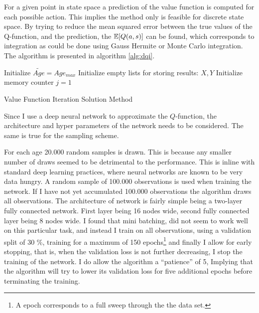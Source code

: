 For a given point in state space a prediction of the value function is computed for each possible action. This implies the method only is feasible for discrete state space. By trying to reduce the mean squared error between the true values of the Q-function, and the prediction, the $\mathbb{E}[Q(a, s)]$ can be found, which corresponds to integration as could be done using Gauss Hermite or Monte Carlo integration. The algorithm is presented in algorithm \ref{alg:dqi}.

\begin{algorithm}[H]
\SetAlgoLined
{}
 Initialize $\tilde{Age} = Age_{max}$\;
 Initialize empty lists for storing results: $X, Y$\;
 Initialize memory counter $j=1$\;
 \caption{Value Function Iteration Solution Method}
 \label{alg:dqi}
 \end{algorithm}

Since I use a deep neural network to approximate the $Q$-function, the architecture and hyper parameters of the network needs to be considered. The same is true for the sampling scheme.

For each age 20.000 random samples is drawn. This is because any smaller number of draws seemed to be detrimental to the performance. This is inline with standard deep learning practices, where neural networks are known to be very data hungry. A random sample of 100.000 observations is used when training the network. If I have not yet accumulated 100.000 observations the algorithm draws all observations. The architecture of network is fairly simple being a two-layer fully connected network. First layer being 16 nodes wide, second fully connected layer being 8 nodes wide. I found that mini batching, did not seem to work well on this particular task, and instead I train on all observations, using a validation split of 30 \%, training for a maximum of 150 epochs\footnote{A epoch corresponds to a full sweep through the the data set.} and finally I allow for early stopping, that is, when the validation loss is not further decreasing, I stop the training of the network. I do allow the algorithm a ``patience'' of 5, Implying that the algorithm will try to lower its validation loss for five additional epochs before terminating the training.


